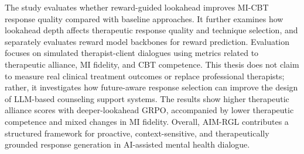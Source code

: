 The study evaluates whether reward-guided lookahead improves MI-CBT response quality compared with baseline approaches. It further examines how lookahead depth affects therapeutic response quality and technique selection, and separately evaluates reward model backbones for reward prediction. Evaluation focuses on simulated therapist-client dialogues using metrics related to therapeutic alliance, MI fidelity, and CBT competence. This thesis does not claim to measure real clinical treatment outcomes or replace professional therapists; rather, it investigates how future-aware response selection can improve the design of LLM-based counseling support systems. The results show higher therapeutic alliance scores with deeper-lookahead GRPO, accompanied by lower therapeutic competence and mixed changes in MI fidelity. Overall, AIM-RGL contributes a structured framework for proactive, context-sensitive, and therapeutically grounded response generation in AI-assisted mental health dialogue.
